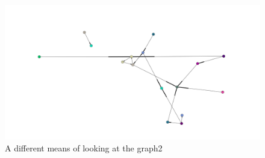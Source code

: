 \documentclass[letterpaper,10pt]{article}
\begin{document}
\begin{figure}[!ht]
\includegraphics[scale=0.3]{images/bt2.png}
\caption{A different means of looking at the graph2}
\label{fig:bt2}
\end{figure}
\end{document}

